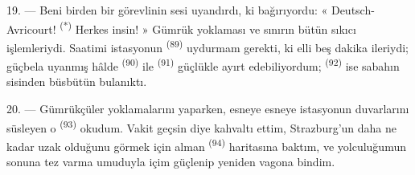 \VUsaut{3.0mm}
\VUsaut{3.0mm}

19. --- Beni birden bir görevlinin sesi uyandırdı, ki bağırıyordu:
« Deutsch-Avricourt! \textsuperscript{(*)} Herkes insin! » Gümrük yoklaması ve
sınırın bütün sıkıcı işlemleriydi. Saatimi istasyonun 
\textsuperscript{(89)} uydurmam gerekti, ki elli beş dakika ileriydi; güçbela
uyanmış hâlde  \textsuperscript{(90)} ile 
\textsuperscript{(91)} güçlükle ayırt edebiliyordum; 
\textsuperscript{(92)} ise sabahın sisinden büsbütün bulanıktı.

20. --- Gümrükçüler yoklamalarını yaparken, esneye esneye istasyonun
duvarlarını süsleyen o  \textsuperscript{(93)} okudum. Vakit
geçsin diye kahvaltı ettim, Strazburg'un daha ne kadar uzak olduğunu görmek
için alman  \textsuperscript{(94)} haritasına baktım, ve
yolculuğumun sonuna tez varma umuduyla içim güçlenip yeniden vagona bindim.
\VUsaut{6.0mm}
\VUfilet{22mm}
